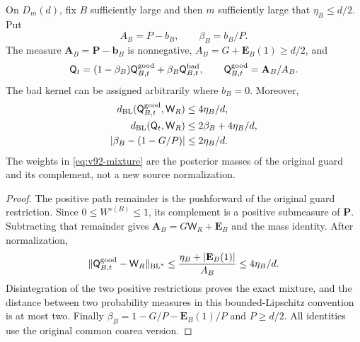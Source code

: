 \begin{proposition}
\label{prop:v92-mixture}
On $D_m(d)$, fix $B$ sufficiently large and then $m$ sufficiently
large that $\eta_B\le d/2$. Put
\[
 A_B=P-b_B,\qquad \beta_B=b_B/P.
\]
The measure $\mathbf A_B=\mathbf P-\mathbf b_B$ is nonnegative,
$A_B=G+\mathbf E_B(1)\ge d/2$, and
\begin{equation}\label{eq:v92-mixture}
 \mathsf Q_t=(1-\beta_B)\mathsf Q_{B,t}^{\rm good}
                       +\beta_B\mathsf Q_{B,t}^{\rm bad},\qquad
 \mathsf Q_{B,t}^{\rm good}=\mathbf A_B/A_B.
\end{equation}
The bad kernel can be assigned arbitrarily where $b_B=0$. Moreover,
\begin{align}
 d_{\mathrm{BL}}(\mathsf Q_{B,t}^{\rm good},\mathsf W_R)
                    &\le4\eta_B/d,\label{eq:v92-good-kernel}\\
 d_{\mathrm{BL}}(\mathsf Q_t,\mathsf W_R)
                    &\le2\beta_B+4\eta_B/d,\label{eq:v92-mixture-bound}\\
 \left|\beta_B-(1-G/P)\right|&\le2\eta_B/d.
                                                   \label{eq:v92-posterior-ratio}
\end{align}
The weights in \eqref{eq:v92-mixture} are the posterior masses of the
original guard and its complement, not a new source normalization.
\end{proposition}
\begin{proof}
The positive path remainder is the pushforward of the original guard
restriction. Since $0\le W^{\varepsilon(B)}\le1$, its complement
is a positive submeasure of $\mathbf P$. Subtracting that remainder
gives $\mathbf A_B=G\mathsf W_R+\mathbf E_B$ and the mass identity.
After normalization,
\[
 \|\mathsf Q_{B,t}^{\rm good}-\mathsf W_R\|_{\mathrm{BL}^*}
 \le\frac{\eta_B+|\mathbf E_B(1)|}{A_B}\le4\eta_B/d.
\]
Disintegration of the two positive restrictions proves the exact
mixture, and the distance between two probability measures in this
bounded-Lipschitz convention is at most two. Finally
$\beta_B=1-G/P-\mathbf E_B(1)/P$ and $P\ge d/2$.
All identities use the original common coarea version.
\end{proof}

